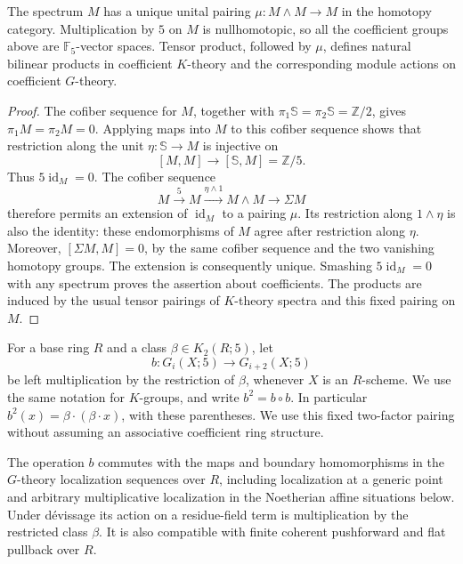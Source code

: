 \begin{lemma}
\label{lem:moore-product}
The spectrum $M$ has a unique unital pairing
$\mu:M\wedge M\to M$ in the homotopy category.  Multiplication by $5$
on $M$ is nullhomotopic, so all the coefficient groups above are
$\mathbb F_5$-vector spaces.  Tensor product, followed by $\mu$, defines
natural bilinear products in coefficient $K$-theory and the corresponding
module actions on coefficient $G$-theory.
\end{lemma}

\begin{proof}
The cofiber sequence for $M$, together with
$\pi_1\mathbb S=\pi_2\mathbb S=\mathbb Z/2$, gives
$\pi_1M=\pi_2M=0$.  Applying maps into $M$ to this cofiber sequence shows
that restriction along the unit $\eta:\mathbb S\to M$ is injective on
\[
 [M,M]\longrightarrow[\mathbb S,M]=\mathbb Z/5.
\]
Thus $5\operatorname{id}_M=0$.  The cofiber sequence
\[
 M\xrightarrow{5}M\xrightarrow{\eta\wedge1}M\wedge M
 \longrightarrow\Sigma M
\]
therefore permits an extension of $\operatorname{id}_M$ to a pairing
$\mu$.  Its restriction along $1\wedge\eta$ is also the identity:
these endomorphisms of $M$ agree after restriction along $\eta$.
Moreover, $[\Sigma M,M]=0$, by the same cofiber sequence and the two
vanishing homotopy groups.  The extension is consequently unique.
Smashing $5\operatorname{id}_M=0$ with any spectrum proves the assertion
about coefficients.  The products are induced by the usual tensor
pairings of $K$-theory spectra and this fixed pairing on $M$.
\end{proof}

For a base ring $R$ and a class $\beta\in K_2(R;5)$, let
\[
 b: G_i(X;5)\longrightarrow G_{i+2}(X;5)
\]
be left multiplication by the restriction of $\beta$, whenever $X$ is
an $R$-scheme.  We use the same notation for $K$-groups, and write
$b^2=b\circ b$.  In particular $b^2(x)=\beta\cdot(\beta\cdot x)$, with these parentheses. We use this fixed two-factor pairing without assuming an associative coefficient ring structure.

\begin{lemma}
\label{lem:bott-localization}
The operation $b$ commutes with the maps and boundary homomorphisms in
the $G$-theory localization sequences over $R$, including localization
at a generic point and arbitrary multiplicative localization in the Noetherian affine situations below. Under d\'evissage its action on a residue-field
term is multiplication by the restricted class $\beta$.  It is also
compatible with finite coherent pushforward and flat pullback over $R$.
\end{lemma}

